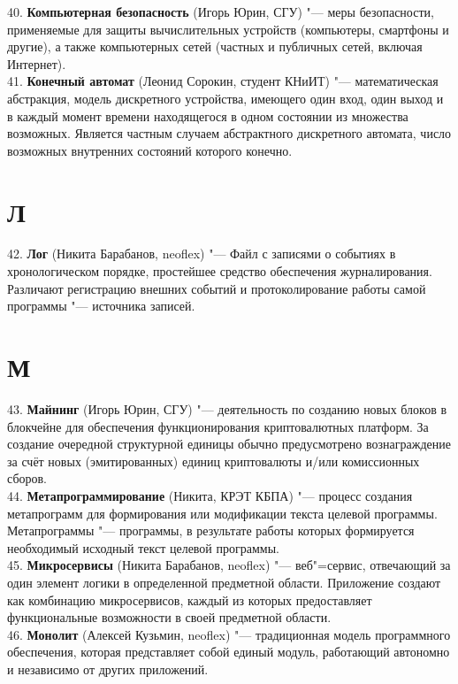 \documentclass[14 pt]{extarticle}
\begin{document}
    40. \textbf{Компьютерная безопасность} (Игорь Юрин, СГУ) "--- меры безопасности, применяемые для защиты вычислительных устройств (компьютеры, смартфоны и другие), а также компьютерных сетей (частных и публичных сетей, включая Интернет). \\
    
    41. \textbf{Конечный автомат} (Леонид Сорокин, студент КНиИТ) "--- математическая абстракция, модель дискретного устройства, имеющего один вход, один выход и в каждый момент времени находящегося в одном состоянии из множества возможных. Является частным случаем абстрактного дискретного автомата, число возможных внутренних состояний которого конечно.  \\
    
\section*{Л}
    42. \textbf{Лог} (Никита Барабанов, neoflex) "--- Файл с записями о событиях в хронологическом порядке, простейшее средство обеспечения журналирования. Различают регистрацию внешних событий и протоколирование работы самой программы "--- источника записей.  \\
    
\section*{М}
    43. \textbf{Майнинг} (Игорь Юрин, СГУ) "--- деятельность по созданию новых блоков в блокчейне для обеспечения функционирования криптовалютных платформ. За создание очередной структурной единицы обычно предусмотрено вознаграждение за счёт новых (эмитированных) единиц криптовалюты и/или комиссионных сборов. \\
    
    44. \textbf{Метапрограммирование} (Никита, КРЭТ КБПА) "--- процесс создания метапрограмм для формирования или модификации текста целевой программы. Метапрограммы "--- программы, в результате работы которых формируется необходимый исходный текст целевой программы. \\
    
    45. \textbf{Микросервисы} (Никита Барабанов, neoflex) "--- веб"=сервис, отвечающий за один элемент логики в определенной предметной области. Приложение создают как комбинацию микросервисов, каждый из которых предоставляет функциональные возможности в своей предметной области. \\
    
    46. \textbf{Монолит} (Алексей Кузьмин, neoflex) "--- традиционная модель программного обеспечения, которая представляет собой единый модуль, работающий автономно и независимо от других приложений. \\
    
\end{document}
